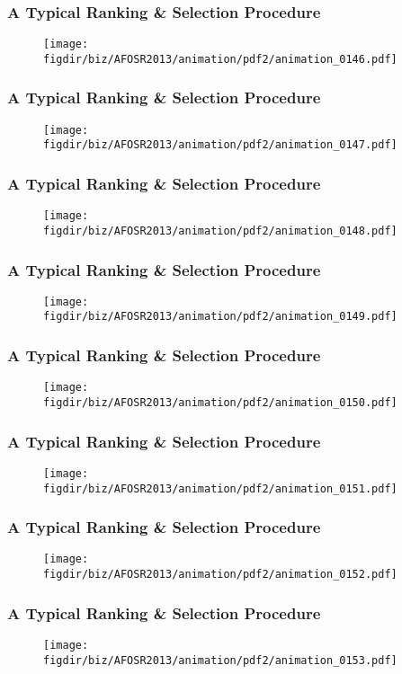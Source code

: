 \documentclass[13pt]{beamer}
\newcommand{\figdir}{../../fig}
\begin{document}
\begin{frame}\frametitle{A Typical Ranking \& Selection Procedure}\begin{figure}\texttt{[image: \\figdir/biz/AFOSR2013/animation/pdf2/animation\_0146.pdf]}\end{figure}\end{frame}
\begin{frame}\frametitle{A Typical Ranking \& Selection Procedure}\begin{figure}\texttt{[image: \\figdir/biz/AFOSR2013/animation/pdf2/animation\_0147.pdf]}\end{figure}\end{frame}
\begin{frame}\frametitle{A Typical Ranking \& Selection Procedure}\begin{figure}\texttt{[image: \\figdir/biz/AFOSR2013/animation/pdf2/animation\_0148.pdf]}\end{figure}\end{frame}
\begin{frame}\frametitle{A Typical Ranking \& Selection Procedure}\begin{figure}\texttt{[image: \\figdir/biz/AFOSR2013/animation/pdf2/animation\_0149.pdf]}\end{figure}\end{frame}
\begin{frame}\frametitle{A Typical Ranking \& Selection Procedure}\begin{figure}\texttt{[image: \\figdir/biz/AFOSR2013/animation/pdf2/animation\_0150.pdf]}\end{figure}\end{frame}
\begin{frame}\frametitle{A Typical Ranking \& Selection Procedure}\begin{figure}\texttt{[image: \\figdir/biz/AFOSR2013/animation/pdf2/animation\_0151.pdf]}\end{figure}\end{frame}
\begin{frame}\frametitle{A Typical Ranking \& Selection Procedure}\begin{figure}\texttt{[image: \\figdir/biz/AFOSR2013/animation/pdf2/animation\_0152.pdf]}\end{figure}\end{frame}
\begin{frame}\frametitle{A Typical Ranking \& Selection Procedure}\begin{figure}\texttt{[image: \\figdir/biz/AFOSR2013/animation/pdf2/animation\_0153.pdf]}\end{figure}\end{frame}
\end{document}
